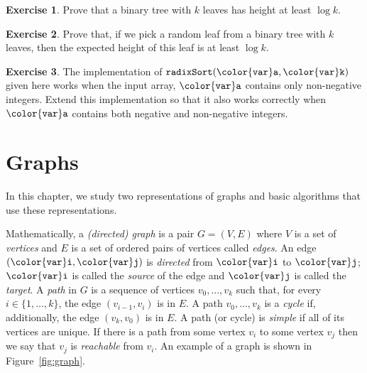 \documentclass[10pt]{book}
\newcommand{\cpponly}[1]{}\newcommand{\javaonly}[1]{#1}\newcommand{\pcodeonly}[1]{}\newcommand{\notpcode}[1]{#1}\newcommand{\lang}{Java}
\newcommand{\chaplabel}[1]{\label{chap:#1}}
\newcommand{\figref}[1]{Figure~\ref{fig:#1}}
\theoremstyle{plain}
\theoremstyle{definition}
\newtheorem{exc}{Exercise}[chapter]
\newcommand{\exclabel}[1]{\label{exc:#1}}
\begin{document}
\begin{exc}
  Prove that a binary tree with $k$ leaves has height at least $\log k$.
\end{exc}

\begin{exc}\exclabel{randomized-lower-bound}
  Prove that, if we pick a random leaf from a binary tree with $k$
  leaves, then the expected height of this leaf is at least $\log k$.
\end{exc}


\begin{exc}
  The implementation of \ensuremath{\mathtt{radixSort({\color{var}a},{\color{var}k})}} given here works when the input
  array, \ensuremath{\mathtt{{\color{var}a}}} contains only \cpponly{unsigned}\javaonly{non-negative}
  integers.  \javaonly{Extend this implementation so that it also
  works correctly when \ensuremath{\mathtt{{\color{var}a}}} contains both negative and non-negative
  integers.}\cpponly{Write a version that works correctly for signed
  integers.}
\end{exc}


\clearpage

\clearpage
\chapter{Graphs}
\chaplabel{graphs}


In this chapter, we study two representations of graphs and basic
algorithms that use these representations.  

Mathematically, a \emph{(directed) graph}
%
%
is a pair $G=(V,E)$ where
$V$ is a set of \emph{vertices}
%
and $E$ is a set of ordered pairs
of vertices called \emph{edges}.
%
An edge \ensuremath{\mathtt{({\color{var}i},{\color{var}j})}} is \emph{directed}
%
from \ensuremath{\mathtt{{\color{var}i}}} to \ensuremath{\mathtt{{\color{var}j}}};  \ensuremath{\mathtt{{\color{var}i}}} is called the \emph{source}
 of the edge and \ensuremath{\mathtt{{\color{var}j}}}
is called the \emph{target}.
  A \emph{path}%
 in $G$ is a sequence of
vertices $v_0,\ldots,v_k$ such that, for every $i\in\{1,\ldots,k\}$,
the edge $(v_{i-1},v_{i})$ is in $E$.  A path $v_0,\ldots,v_k$ is a
\emph{cycle}
%
if, additionally, the edge $(v_k,v_0)$ is in $E$.  A path (or
cycle) is \emph{simple}
%
if all of its vertices are unique.  If there
is a path from some vertex $v_i$ to some vertex $v_j$ then we say that
$v_j$ is \emph{reachable}
 from $v_i$.  An example of a graph is shown
in \figref{graph}.
\end{document}
